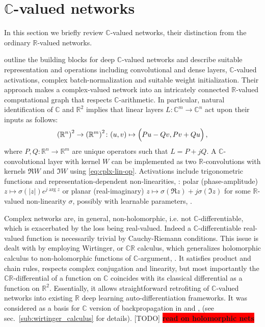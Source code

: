 \documentclass[a4paper,10pt]{article}
\newcommand{\real}{\mathbb{R}}
\newcommand{\cplx}{\mathbb{C}}
\newcommand{\important}[1]{\textbf{\!\colorbox{red}{#1}\!}}
\newcommand{\todo}[1]{{\color{blue} [TODO]} \important{#1}}
\begin{document}



\section{$\cplx$-valued networks} %
\label{sec:c_valued_networks}

In this section we briefly review $\cplx$-valued networks, their distinction from the
ordinary $\real$-valued networks.

\citet{trabelsi_deep_2017} outline the building blocks for deep $\cplx$-valued networks
and describe suitable representation and operations including convolutional and dense layers,
$\cplx$-valued activations, complex batch-normalization and suitable weight initialization.
Their approach makes a complex-valued network into an intricately connected $\real$-valued
computational graph that respects $\cplx$-arithmetic.
%
In particular, natural identification of $\cplx$ and $\real^2$ implies that linear layers $
  L \colon \cplx^m \to \cplx^n
$ act upon their inputs as follows:
\begin{equation}  \label{eq:cplx-lin-op}
  {(\real^n)}^{2}
    \to {(\real^m)}^{2}
    \colon (u, v)
      \mapsto \Bigl(
        P u - Q v,
        P v + Q u
      \Bigr)
    \,,
\end{equation}
where $
  P, Q \colon \real^{n} \to \real^{m}
$ are unique operators such that $L = P + j Q$. A $\cplx$-convolutional layer with kernel
$W$ can be implemented as two $\real$-convolutions with kernels $\Re{W}$ and $\Im{W}$ using
\eqref{eq:cplx-lin-op}. Activations include trigonometric functions and representation-dependent
non-linearities, \citep{hirose_complex-valued_2009}: polar (phase-amplitude) $
  z \mapsto \sigma(\lvert z \rvert) e^{j \arg z}
$ or planar (real-imaginary) $
  z \mapsto \sigma(\Re z) + j \sigma(\Im z)
$ for some $\real$-valued non-linearity $\sigma$, possibly with learnable parameters,
\citep{trabelsi_deep_2017,wolter_complex_2018}.

Complex networks are, in general, non-holomorphic, i.e. not $\cplx$-differentiable, which is
exacerbated by the loss being real-valued. Indeed a $\cplx$-differentiable real-valued function is
necessarily trivial by Cauchy-Riemann conditions. This issue is dealt with by employing Wirtinger,
or $\cplx\real$ calculus, which generalizes holomorphic calculus to non-holomorphic functions
of $\cplx$-argument, \citep{adali_complex-valued_2011,boeddeker_computation_2019}. It satisfies
product and chain rules, respects complex conjugation and linearity, but most importantly the
$\cplx\real$-differential of a function on $\cplx$ coincides with its classical differential as
a function on $\real^2$. Essentially, it allows straightforward retrofiting of $\cplx$-valued
networks into existing $\real$ deep learning auto-differentiation frameworks. It was considered
as a basis for $\cplx$ version of backpropagation in \citep{benvenuto_complex_1992} and
\citep{trabelsi_deep_2017}, (see sec.~\ref{sub:wirtinger_calculus} for details).
%
\todo{read on holomorphic nets}
\end{document}
